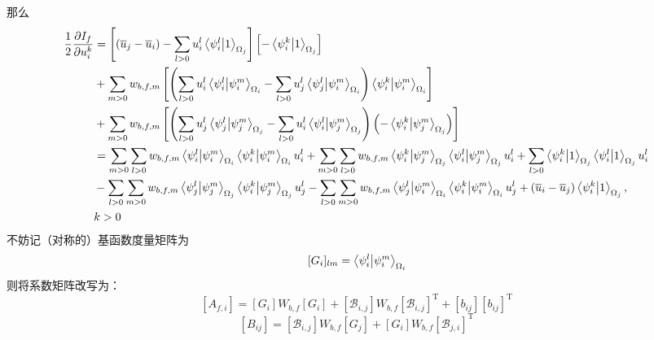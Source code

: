 \documentclass[UTF8,zihao=5]{ctexart} %
\newcommand{\trans}[0]{^\mathrm{T}}
\newcommand*{\pd}[2]{\frac{\partial #1}{\partial #2}}
\newcommand*{\mean}[1]{\overline{#1}}
\begin{document}
那么
$$
    \begin{aligned}
        \frac{1}{2}\pd{I_f}{u_i^k}
         & =
        \left[
            (\mean{u}_j - \mean{u}_i)
            - \sum_{l>0}u_i^l\innerproduct{\psi_i^l}{1}_{\Omega_j}
            \right]\left[
            - \innerproduct{\psi_i^k}{1}_{\Omega_j}
            \right]
        \\
         & +
         \sum_{m>0}
         {w_{b,f,m}\left[\left(
             \sum_{l>0}u_i^l\innerproduct{\psi_i^l}{\psi_i^m}_{\Omega_i}
             - \sum_{l>0}u_j^l\innerproduct{\psi_j^l}{\psi_i^m}_{\Omega_i}
             \right)\innerproduct{\psi_i^k}{\psi_i^m}_{\Omega_i}
             \right]
             }
        \\ &+
        \sum_{m>0}
        w_{b,f,m}\left[
            {\left(
                    \sum_{l>0}u_j^l\innerproduct{\psi_j^l}{\psi_j^m}_{\Omega_j}
                    - \sum_{l>0}u_i^l\innerproduct{\psi_i^l}{\psi_j^m}_{\Omega_j}
                    \right)\left(
                    - \innerproduct{\psi_i^k}{\psi_j^m}_{\Omega_j}
                    \right)}
        \right]                                    \\
         & =
        \sum_{m>0}\sum_{l>0}w_{b,f,m}
        \innerproduct{\psi_i^l}{\psi_i^m}_{\Omega_i}
        \innerproduct{\psi_i^k}{\psi_i^m}_{\Omega_i}
        u_i^l +
        \sum_{m>0}\sum_{l>0}w_{b,f,m}
        \innerproduct{\psi_i^k}{\psi_j^m}_{\Omega_j}
        \innerproduct{\psi_i^l}{\psi_j^m}_{\Omega_j}u_i^l +
        \sum_{l>0}
        \innerproduct{\psi_i^k}{1}_{\Omega_j}
        \innerproduct{\psi_i^l}{1}_{\Omega_j}u_i^l \\
         &
        - \sum_{l>0}\sum_{m>0}w_{b,f,m}
        \innerproduct{\psi_j^l}{\psi_j^m}_{\Omega_j}
        \innerproduct{\psi_i^k}{\psi_j^m}_{\Omega_j}u_j^l
        - \sum_{l>0}\sum_{m>0}w_{b,f,m}
        \innerproduct{\psi_j^l}{\psi_i^m}_{\Omega_i}
        \innerproduct{\psi_i^k}{\psi_i^m}_{\Omega_i}u_j^l
        + (\mean{u}_i - \mean{u}_j)\innerproduct{\psi_i^k}{1}_{\Omega_j}
        , \\
        &k>0
    \end{aligned}
$$
不妨记（对称的）基函数度量矩阵为
$$
[G_i]_{lm} = \innerproduct{\psi_i^l}{\psi_i^m}_{\Omega_i}
$$
则将系数矩阵改写为：
$$
    [A_{f,i}] = [G_i]W_{b,f}[G_i] +
    [\mathcal{B}_{i,j}] W_{b,f} [\mathcal{B}_{i,j}]\trans
    +
    [b_{ij}][b_{ij}]\trans
$$
$$
    [B_{ij}] =
    [\mathcal{B}_{i,j}]W_{b,f}[G_j]
    +
    [G_i]W_{b,f}[\mathcal{B}_{j,i}]\trans
$$
\end{document}
